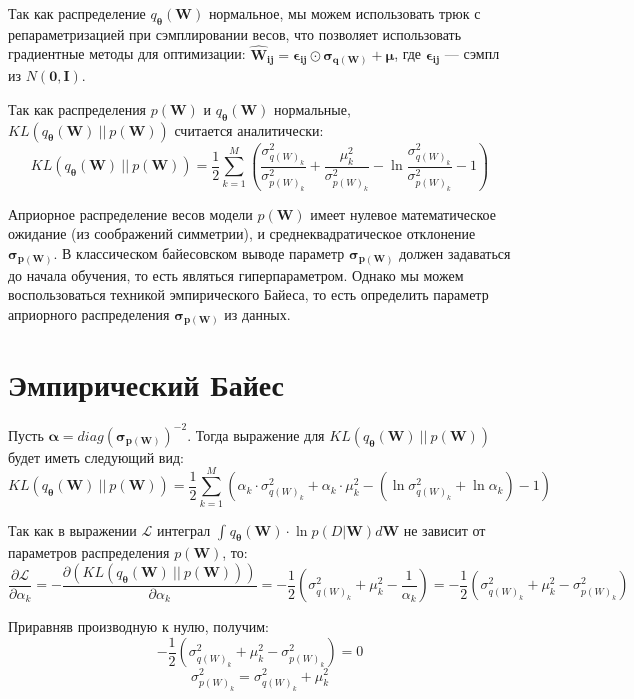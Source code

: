 \documentclass{article}
\begin{document}
    Так как распределение $q_{\pmb{\theta}}(\pmb{W})$ нормальное, мы можем использовать трюк с репараметризацией при сэмплировании весов, что позволяет использовать градиентные методы для оптимизации:
    $
    \pmb{\hat{W}_{ij}} = \pmb{\epsilon_{ij}}  \odot \pmb{\sigma_{q(\pmb{W})}} + \pmb{\mu}
    $, где $\pmb{\epsilon_{ij}}$ --- сэмпл из $N(\pmb{0}, \pmb{I})$.

    Так как распределения $p(\pmb{W})$ и $q_{\pmb{\theta}}(\pmb{W})$ нормальные, $KL(q_{\pmb{\theta}}(\pmb{W})~||~p(\pmb{W}))$ считается аналитически:
    \[
    KL(q_{\pmb{\theta}}(\pmb{W})~||~p(\pmb{W})) =
    \dfrac{1}{2}\sum_{k=1}^{M}(\dfrac{\sigma_{{q(W)_{k}}}^2}{\sigma_{{p(W)_{k}}}^2} + \dfrac{\mu_{k}^2}{\sigma_{{p(W)_{k}}}^2} - \ln{\dfrac{\sigma_{{q(W)_{k}}}^2}{\sigma_{{p(W)_{k}}}^2}} - 1)
    \]

    Априорное распределение весов модели $p(\pmb{W})$ имеет нулевое математическое ожидание (из соображений симметрии), и среднеквадратическое отклонение $\pmb{\sigma_{p(\pmb{W})}}$. В классическом байесовском выводе параметр $\pmb{\sigma_{p(\pmb{W})}}$ должен задаваться до начала обучения, то есть являться гиперпараметром. Однако мы можем воспользоваться техникой эмпирического Байеса, то есть определить параметр  априорного распределения $\pmb{\sigma_{p(\pmb{W})}}$ из данных.

    \section{Эмпирический Байес}
    Пусть $\pmb{\alpha} = diag(\pmb{\sigma_{p(\pmb{W})}})^{-2}$. Тогда выражение для $KL(q_{\pmb{\theta}}(\pmb{W})~||~p(\pmb{W}))$ будет иметь следующий вид:
    \[
    KL(q_{\pmb{\theta}}(\pmb{W})~||~p(\pmb{W})) =
    \dfrac{1}{2}\sum_{k=1}^{M}( \alpha_{k} \cdot \sigma_{{q(W)_{k}}}^2 + \alpha_{k} \cdot \mu_{k}^2 - (\ln{\sigma_{{q(W)_{k}}}^2} + \ln{\alpha_{k}}) - 1)
    \]

    Так как в выражении $\mathcal{L}$ интеграл $\int_{}{} q_{\pmb{\theta}}(\pmb{W}) \cdot \ln{p(D | \pmb{W})} d \pmb{W}$ не зависит от параметров распределения $p(\pmb{W})$, то:
    \[
    \dfrac{\partial \mathcal{L}}{\partial {\alpha_k}} =
    - \dfrac{\partial (KL(q_{\pmb{\theta}}(\pmb{W})~||~p(\pmb{W})))}{\partial {\alpha_k}} =
    -\dfrac{1}{2}(\sigma_{{q(W)_{k}}}^2 + \mu_{k}^2 - \dfrac{1}{\alpha_k}) =
    -\dfrac{1}{2}(\sigma_{{q(W)_{k}}}^2 + \mu_{k}^2 - \sigma_{{p(W)_{k}}}^2)
    \]

    Приравняв производную к нулю, получим:
    \[
    -\dfrac{1}{2}(\sigma_{{q(W)_{k}}}^2 + \mu_{k}^2 - \sigma_{{p(W)_{k}}}^2) = 0
    \]\[
    \sigma_{{p(W)_{k}}}^2 = \sigma_{{q(W)_{k}}}^2 + \mu_{k}^2
    \]
\end{document}
